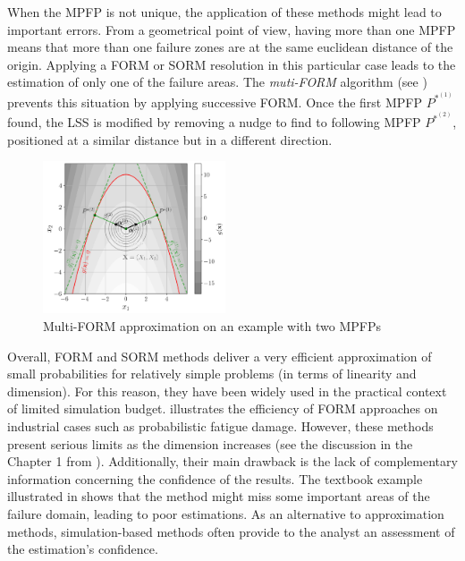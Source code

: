 When the MPFP is not unique, the application of these methods might lead to important errors. 
From a geometrical point of view, having more than one MPFP means that more than one failure zones are at the same euclidean distance of the origin. 
Applying a FORM or SORM resolution in this particular case leads to the estimation of only one of the failure areas. 
The \textit{muti-FORM} algorithm (see \citet{derkiureghian_1998}) prevents this situation by applying successive FORM. 
Once the first MPFP $P^{*^{(1)}}$ found, the LSS is modified by removing a nudge to find to following MPFP $P^{*^{(2)}}$, positioned at a similar distance but in a different direction. 

\begin{figure}[ht]
    \centering
    \includegraphics[width=0.48\textwidth]{../numerical_experiments/chapter1/figures/reliability_multiform.png}
    \caption{Multi-FORM approximation on an example with two MPFPs}
    \label{fig:multi_FORM}
\end{figure}


Overall, FORM and SORM methods deliver a very efficient approximation of small probabilities for relatively simple problems (in terms of linearity and dimension). 
For this reason, they have been widely used in the practical context of limited simulation budget. 
\citet{straub_2014_fatigue_form} illustrates the efficiency of FORM approaches on industrial cases such as probabilistic fatigue damage. 
However, these methods present serious limits as the dimension increases (see the discussion in the Chapter 1 from \citet{chabridon_2018_thesis}). 
Additionally, their main drawback is the lack of complementary information concerning the confidence of the results. 
The textbook example illustrated in  shows that the method might miss some important areas of the failure domain, leading to poor estimations. 
As an alternative to approximation methods, simulation-based methods often provide to the analyst an assessment of the estimation's confidence. 


